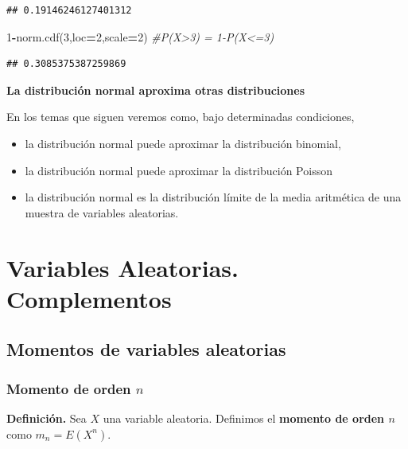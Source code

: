 \documentclass[]{book}
\newenvironment{Shaded}{\begin{snugshade}}{\end{snugshade}}
\newcommand{\CommentTok}[1]{\textcolor[rgb]{0.56,0.35,0.01}{\textit{#1}}}
\newcommand{\DecValTok}[1]{\textcolor[rgb]{0.00,0.00,0.81}{#1}}
\newcommand{\NormalTok}[1]{#1}
\newcommand{\OperatorTok}[1]{\textcolor[rgb]{0.81,0.36,0.00}{\textbf{#1}}}
\providecommand{\tightlist}{%
  \setlength{\itemsep}{0pt}\setlength{\parskip}{0pt}}
\begin{document}
\begin{verbatim}
## 0.19146246127401312
\end{verbatim}

\begin{Shaded}
\begin{Highlighting}[]
\DecValTok{1}\OperatorTok{-}\NormalTok{norm.cdf(}\DecValTok{3}\NormalTok{,loc}\OperatorTok{=}\DecValTok{2}\NormalTok{,scale}\OperatorTok{=}\DecValTok{2}\NormalTok{) }\CommentTok{#P(X>3) = 1-P(X<=3)}
\end{Highlighting}
\end{Shaded}

\begin{verbatim}
## 0.3085375387259869
\end{verbatim}

\textbf{La distribución normal aproxima otras distribuciones}

En los temas que siguen veremos como, bajo determinadas condiciones,

\begin{itemize}
\tightlist
\item
  la distribución normal puede aproximar la distribución binomial,
\item
  la distribución normal puede aproximar la distribución Poisson
\item
  la distribución normal es la distribución límite de la media aritmética de una muestra de variables aleatorias.
\end{itemize}

\hypertarget{variables-aleatorias.-complementos}{%
\chapter{Variables Aleatorias. Complementos}\label{variables-aleatorias.-complementos}}

\hypertarget{momentos-de-variables-aleatorias}{%
\section{Momentos de variables aleatorias}\label{momentos-de-variables-aleatorias}}

\hypertarget{momento-de-orden-n}{%
\subsection{\texorpdfstring{Momento de orden \(n\)}{Momento de orden n}}\label{momento-de-orden-n}}

\textbf{Definición.}
Sea \(X\) una variable aleatoria. Definimos el \textbf{momento de orden \(n\)} como
\(m_n = E\left(X^n\right)\).
\end{document}
